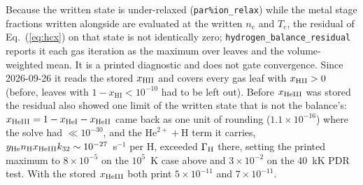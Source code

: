 \documentclass[english,a4paper]{my_memo}
\newcommand{\code}[1]{\texttt{#1}}
\newcommand{\xHI}{x_{\mathrm{HI}}}
\begin{document}
Because the written state is under-relaxed (\code{par\%ion\_relax}) while
the metal stage fractions written alongside are evaluated at the written
$n_e$ and $T_e$, the residual of Eq.~(\ref{eq:hcx}) on that state is not
identically zero; \code{hydrogen\_balance\_residual} reports it each gas
iteration as the maximum over leaves and the volume-weighted mean.  It is
a printed diagnostic and does not gate convergence.  Since 2026-09-26 it
reads the stored $x_{\rm HII}$ and covers every gas leaf with
$x_{\rm HII} > 0$ (before, leaves with $1 - \xHI < 10^{-10}$ had to be left
out).  Before $x_{\rm HeIII}$ was stored the residual also showed one limit
of the written state that is not the balance's:
$x_{\rm HeIII} = 1 - x_{\rm HeI} - x_{\rm HeII}$ came back as one unit of
rounding ($1.1\times10^{-16}$) where the solve had $\ll 10^{-30}$, and the
$\mathrm{He}^{2+}+\mathrm{H}$ term it carries,
$y_{\rm He}n_{\rm H}x_{\rm HeIII}k_{32} \sim 10^{-27}$~s$^{-1}$ per H,
exceeded $\Gamma_{\rm H}$ there, setting the printed maximum to
$8\times10^{-5}$ on the $10^5$~K case above and $3\times10^{-2}$ on the
40~kK PDR test.  With the stored $x_{\rm HeIII}$ both print
$5\times10^{-11}$ and $7\times10^{-11}$.
\end{document}

